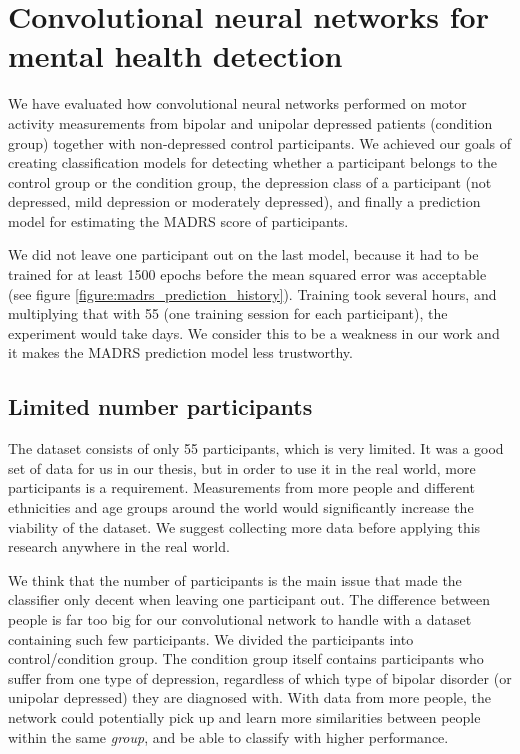 \section{Convolutional neural networks for mental health detection}
We have evaluated how convolutional neural networks performed on motor activity measurements from bipolar and unipolar depressed patients (condition group) together with non-depressed control participants. We achieved our goals of creating classification models for detecting whether a participant belongs to the control group or the condition group, the depression class of a participant (not depressed, mild depression or moderately depressed), and finally a prediction model for estimating the MADRS score of participants. 

We did not leave one participant out on the last model, because it had to be trained for at least 1500 epochs before the mean squared error was acceptable (see figure \ref{figure:madrs_prediction_history}). Training took several hours, and multiplying that with 55 (one training session for each participant), the experiment would take days. We consider this to be a weakness in our work and it makes the MADRS prediction model less trustworthy. 

\subsection{Limited number participants}
The dataset consists of only 55 participants, which is very limited. It was a good set of data for us in our thesis, but in order to use it in the real world, more participants is a requirement. Measurements from more people and different ethnicities and age groups around the world would significantly increase the viability of the dataset. We suggest collecting more data before applying this research anywhere in the real world.
 
We think that the number of participants is the main issue that made the classifier only decent when leaving one participant out. The difference between people is far too big for our convolutional network to handle with a dataset containing such few participants. We divided the participants into control/condition group. The condition group itself contains participants who suffer from one type of depression, regardless of which type of bipolar disorder (or unipolar depressed) they are diagnosed with. With data from more people, the network could potentially pick up and learn more similarities between people within the same \textit{group}, and be able to classify with higher performance. 

